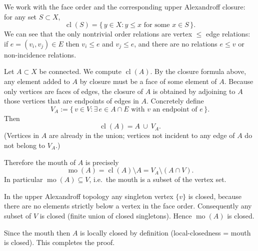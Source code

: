 \documentclass{article}
\theoremstyle{definition}
\theoremstyle{plain}
\theoremstyle{remark}
\newcommand{\1}{\mathbbm{1}}  %
\renewenvironment{proof}{{\bf Proof:\ }}{\qedsymbol}%
\begin{document}
\begin{proof}
We work with the face order and the corresponding upper Alexandroff closure:
for any set \(S\subset X\),
\[
\operatorname{cl}(S)=\{\,y\in X : y\le x \text{ for some } x\in S\,\}.
\]
We can see that the only nontrivial order relations are vertex \(\le\) edge
relations: if \(e=(v_i,v_j)\in E\) then \(v_i\le e\) and \(v_j\le e\),
and there are no relations \(e\le v\) or non-incidence relations.

Let \(A\subset X\) be connected. We compute \(\operatorname{cl}(A)\).
By the closure formula above, any element added to \(A\) by closure must
be a face of some element of \(A\). Because only vertices are faces of
edges, the closure of \(A\) is obtained by adjoining to \(A\) those
vertices that are endpoints of edges in \(A\). Concretely define
\[
V_A := \{\, v\in V : \exists\, e\in A\cap E \text{ with } v\text{ an endpoint of }e \,\}.
\]
Then
\[
\operatorname{cl}(A)=A\ \cup\ V_A.
\]
(Vertices in \(A\) are already in the union; vertices not incident to any
edge of \(A\) do not belong to \(V_A\).)

Therefore the mouth of \(A\) is precisely
\[
\operatorname{mo}(A)=\operatorname{cl}(A)\setminus A = V_A\setminus (A\cap V).
\]
In particular \(\operatorname{mo}(A)\subseteq V\), i.e.\ the mouth is a
subset of the vertex set.

In the upper Alexandroff topology any singleton vertex \(\{v\}\) is closed,
because there are no elements strictly below a vertex in the face order.
Consequently any subset of \(V\) is closed (finite union of closed singletons).
Hence \(\operatorname{mo}(A)\) is closed.

Since the mouth then \(A\) is locally
closed by definition (local-closedness = mouth is closed). This completes the
proof.
\end{proof}
\end{document}
